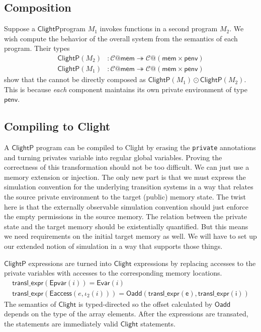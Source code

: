 \documentclass[acmsmall,screen,review,anonymous]{acmart}
\newcommand{\kw}[1]{\ensuremath{ \mathsf{#1} }}
\newcommand{\ClightP}{\ensuremath{ \mathsf{ClightP} }}
\newcommand{\Clight}{\ensuremath{ \mathsf{Clight} }}
\begin{document}

\subsection{Composition} %

Suppose a \ClightP program $M_1$
invokes functions in a second program $M_2$.
We wish compute the behavior of the overall system
from the semantics of each program.
Their types
\begin{align*}
    \ClightP(M_2) &:
    \mathcal{C}@\kw{mem} \twoheadrightarrow
    \mathcal{C}@(\kw{mem} \times \kw{penv})
  \\
    \ClightP(M_1) &:
    \mathcal{C}@\kw{mem} \twoheadrightarrow
    \mathcal{C}@(\kw{mem} \times \kw{penv})
\end{align*}
show that the cannot be directly composed
as $\ClightP(M_1) \odot \ClightP(M_2)$.
This is because \emph{each} component
maintains its own private environment of type $\kw{penv}$.


\subsection{Compiling to Clight} %

A \ClightP{} program can be compiled to Clight
by erasing the \texttt{private} annotations
and turning privates variable into regular
global variables.
{
\color{gray}
Proving the correctness of this transformation
should not be too difficult.
We can just use a memory extension or injection.
The only new part is that we must express
the simulation convention for the underlying transition systems
in a way that relates the source private environment
to the target (public) memory state.
The twist here is that
the externally observable simulation convention
should just enforce the empty permissions in the source memory.
The relation between the private state and the target memory
should be existentially quantified.
But this means we need requirements on the initial target memory as well.
We will have to set up our extended notion of simulation
in a way that supports those things.
}

$\ClightP$ expressions are turned into $\Clight$ expressions
by replacing accesses to the private variables
with accesses to the corresponding memory locations.
\begin{gather*}
  \kw{transl\_expr}(\kw{Epvar}(i)) = \kw{Evar}(i)\\
  \kw{transl\_expr}(\kw{Eaccess}(e, \iota_2(i))) = \kw{Oadd}(\kw{transl\_expr(e)}, \kw{transl\_expr(i)})
\end{gather*}
The semantics of $\Clight$ is typed-directed
so the offset calculated by $\kw{Oadd}$
depends on the type of the array elements.
After the expressions are transated, the statements
are immediately valid $\Clight$ statements.
\end{document}
